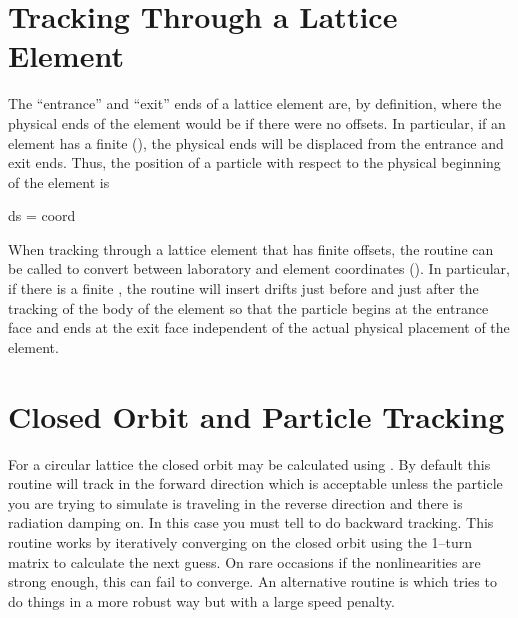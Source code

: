 {{{{{{%
\section{Tracking Through a Lattice Element}
\label{s:ele.track}

The ``entrance'' and ``exit'' ends of a lattice element are, by definition,
where the physical ends of the element would be if there were no
offsets. In particular, if an element has a finite 
(), the physical ends will be displaced from
the entrance and exit ends. Thus, the position  of a particle with
respect to the physical beginning of the element is
\begin{example}
  ds = coord%
\end{example}

When tracking through a lattice element that has finite offsets, the
 routine can be called to
convert between laboratory and element coordinates
(). In particular, if there is a finite
, the  routine will insert drifts
just before and just after the tracking of the body of the element so
that the particle begins at the entrance face and ends at the exit
face independent of the actual physical placement of the element.

\section{Closed Orbit and Particle Tracking}

For a circular lattice the closed orbit may be calculated using
. By default this routine will track in the
forward direction which is acceptable unless the particle you are
trying to simulate is traveling in the reverse direction and there is
radiation damping on. In this case you must tell
 to do backward tracking. This routine works by
iteratively converging on the closed orbit using the 1--turn matrix to
calculate the next guess. On rare occasions if the nonlinearities are
strong enough, this can fail to converge. An alternative routine is
 which tries to do things in a more
robust way but with a large speed penalty.

}}}}}}
